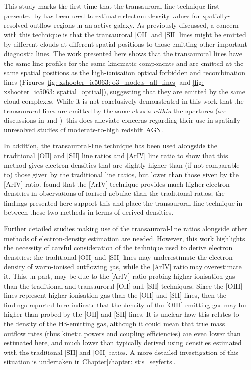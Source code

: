 This study marks the first time that the transauroral-line technique first presented by \citet{Holt2011} has been used to estimate electron density values for spatially-resolved outflow regions in an active galaxy. As previously discussed, a concern with this technique is that the transauroral [OII] and [SII] lines might be emitted by different clouds at different spatial positions to those emitting other important diagnostic lines. The work presented here shows that the transauroral lines have the same line profiles for the same kinematic components and are emitted at the same spatial positions as the high-ionisation optical forbidden and recombination lines (Figures \ref{fig: xshooter_ic5063: o3_models_all_lines} and \ref{fig: xshooter_ic5063: spatial_optical}), suggesting that they are emitted by the same cloud complexes. While it is not conclusively demonstrated in this work that the transauroral lines are emitted by the same clouds \textit{within} the apertures (see discussions in \citealt{Sun2017} and \citealt{Rose2018}), this does alleviate concerns regarding their use in spatially-unresolved studies of moderate-to-high redshift AGN.

In addition, the transauroral-line technique has been used alongside the traditional [OII] and [SII] line ratios and [ArIV] line ratio to show that this method gives electron densities that are slightly higher than (if not comparable to) those given by the traditional line ratios, but lower than those given by the [ArIV] ratio. \citet{Wang2004} found that the [ArIV] technique provides much higher electron densities in observations of ionised nebulae than the traditional ratios; the findings presented here support this and place the transauroral-line technique in between these two methods in terms of derived densities. 

Further detailed studies making use of the transauroral-line ratios alongside other methods of electron-density estimation are needed. However, this work highlights the necessity of careful consideration of the technique used to derive electron densities: the traditional [OII] and [SII] lines may underestimate the electron density of warm-ionised outflowing gas, while the [ArIV] ratio may overestimate it. This, in part, may be due to the [ArIV] ratio probing higher-ionisation gas than the traditional and transauroral [OII] and [SII] techniques. Since the [OIII] lines represent higher-ionisation gas than the [OII] and [SII] lines, then the findings reported here indicate that the density of the [OIII]-emitting gas may be higher than probed by the [OII] and [SII] lines. It is unclear how this relates to the density of the H$\mathrm{\beta}$-emitting gas, although it could mean that true mass outflow rates (thus kinetic powers and coupling efficiencies) are even lower than estimated here, and much lower than typically derived using densities estimated with the traditional [SII] and [OII] ratios. A more detailed investigation of this situation is undertaken in Chapter\;\ref{chapter: stis_seyferts}.

